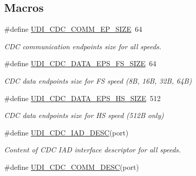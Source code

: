 \subsection*{Macros}
\begin{DoxyCompactItemize}
\item 
\hypertarget{group__udi__cdc__group__desc_ga186a4ed83a0c245ad4fb377ed96ccd9c}{\#define \hyperlink{group__udi__cdc__group__desc_ga186a4ed83a0c245ad4fb377ed96ccd9c}{U\-D\-I\-\_\-\-C\-D\-C\-\_\-\-C\-O\-M\-M\-\_\-\-E\-P\-\_\-\-S\-I\-Z\-E}~64}\label{group__udi__cdc__group__desc_ga186a4ed83a0c245ad4fb377ed96ccd9c}

\begin{DoxyCompactList}\small\item\em C\-D\-C communication endpoints size for all speeds. \end{DoxyCompactList}\item 
\hypertarget{group__udi__cdc__group__desc_gaacbee1668eb15fb80ae0f64992346e6b}{\#define \hyperlink{group__udi__cdc__group__desc_gaacbee1668eb15fb80ae0f64992346e6b}{U\-D\-I\-\_\-\-C\-D\-C\-\_\-\-D\-A\-T\-A\-\_\-\-E\-P\-S\-\_\-\-F\-S\-\_\-\-S\-I\-Z\-E}~64}\label{group__udi__cdc__group__desc_gaacbee1668eb15fb80ae0f64992346e6b}

\begin{DoxyCompactList}\small\item\em C\-D\-C data endpoints size for F\-S speed (8\-B, 16\-B, 32\-B, 64\-B) \end{DoxyCompactList}\item 
\hypertarget{group__udi__cdc__group__desc_gae306f9ea8dab2760a4f38dc91a809fb4}{\#define \hyperlink{group__udi__cdc__group__desc_gae306f9ea8dab2760a4f38dc91a809fb4}{U\-D\-I\-\_\-\-C\-D\-C\-\_\-\-D\-A\-T\-A\-\_\-\-E\-P\-S\-\_\-\-H\-S\-\_\-\-S\-I\-Z\-E}~512}\label{group__udi__cdc__group__desc_gae306f9ea8dab2760a4f38dc91a809fb4}

\begin{DoxyCompactList}\small\item\em C\-D\-C data endpoints size for H\-S speed (512\-B only) \end{DoxyCompactList}\item 
\#define \hyperlink{group__udi__cdc__group__desc_ga39928ecb0423aff5f7ab70ae98eb2c94}{U\-D\-I\-\_\-\-C\-D\-C\-\_\-\-I\-A\-D\-\_\-\-D\-E\-S\-C}(port)
\begin{DoxyCompactList}\small\item\em Content of C\-D\-C I\-A\-D interface descriptor for all speeds. \end{DoxyCompactList}\item 
\hypertarget{group__udi__cdc__group__desc_gac76fc1207bccd36e9851945206c063c0}{\#define \hyperlink{group__udi__cdc__group__desc_gac76fc1207bccd36e9851945206c063c0}{U\-D\-I\-\_\-\-C\-D\-C\-\_\-\-C\-O\-M\-M\-\_\-\-D\-E\-S\-C}(port)}\label{group__udi__cdc__group__desc_gac76fc1207bccd36e9851945206c063c0}


\end{DoxyCompactItemize}
